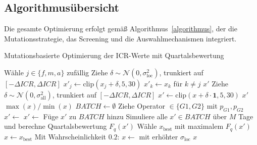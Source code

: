 \subsection{Algorithmusübersicht}
Die gesamte Optimierung erfolgt gemäß Algorithmus~\ref{algorithmus}, der die Mutationsstrategie, das Screening und die Auswahlmechanismen integriert.

\medskip

\begin{algorithm}
\caption{Mutationsbasierte Optimierung der ICR-Werte mit Quartalsbewertung}
\label{algorithmus}
\begin{algorithmic}[1]
  \State Wähle $j \in \{f, m, a\}$ zufällig
  \State Ziehe $\delta \sim \mathcal{N}(0, \sigma_{\text{loc}}^2)$, trunkiert auf $[-\Delta ICR, \Delta ICR]$
  \State $x'_j \gets \text{clip}(x_j + \delta, 5, 30)$
  \State $x'_k \gets x_k$ für $k \neq j$
  \State \Return $x'$
\EndFunction
\State
{}
  \State Ziehe $\delta \sim \mathcal{N}(0, \sigma_{\text{all}}^2)$, trunkiert auf $[-\Delta ICR, \Delta ICR]$
  \State $x' \gets \text{clip}(x + \delta \cdot \mathbf{1}, 5, 30)$
  \State \Return $x'$
\EndFunction
\State
{}
  \State \Return $\max(x) / \min(x)$
\EndFunction
\State
{}
  \State $BATCH \gets \emptyset$
    \State Ziehe Operator $\in \{G1, G2\}$ mit $p_{G1}, p_{G2}$
      \State $x' \gets$ 
    \Else
      \State $x' \gets$ 
    \EndIf
      \State Füge $x'$ zu $BATCH$ hinzu
    \EndIf
  \EndFor
  \State Simuliere alle $x' \in BATCH$ über $M$ Tage und berechne Quartalsbewertung $F_q(x')$
  \State Wähle $x_{\text{best}}$ mit maximalem $F_q(x')$
    \State $x \gets x_{\text{best}}$
  \Else
    \State Mit Wahrscheinlichkeit $0.2$: $x \gets$  mit erhöhter $\sigma_{\text{loc}}$
  \EndIf
  \State \Return $x$
\EndFunction

\end{algorithmic}
\end{algorithm}